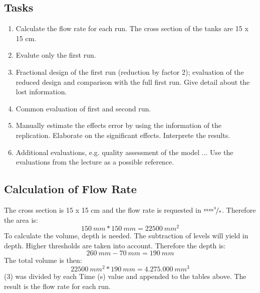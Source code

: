 \subsection{Tasks}
\begin{enumerate}
\item Calculate the flow rate for each run. The cross section of the tanks are 15 x 15 cm.
\item Evalute only the first run.
\item Fractional design of the first run (reduction by factor 2); evaluation of the reduced design and comparison with the full first run. Give detail about the lost information.
\item Common evaluation of first and second run.
\item Manually estimate the effects error by using the information of the replication. Elaborate on the significant effects. Interprete the results.
\item Additional evaluations, e.g. quality assessment of the model ... Use the evaluations from the lecture as a possible reference.
\end{enumerate}

\subsection{Calculation of Flow Rate}
The cross section is 15 x 15 cm and the flow rate is requested in $\nicefrac{mm^3}{s}$. Therefore the area is:
\begin{equation}
150\:mm * 150\:mm = 22500\:mm^2
\end{equation}
To calculate the volume, depth is needed. The subtraction of levels will yield in depth. Higher thresholds are taken into account. Therefore the depth is:
\begin{equation}
260\:mm - 70\:mm = 190\:mm
\end{equation}
The total volume is then:
\begin{equation}
22500\:mm^2 * 190\:mm = 4.275.000\:mm^3
\end{equation}
(3) was divided by each Time (s) value and appended to the tables above. The result is the flow rate for each run.

